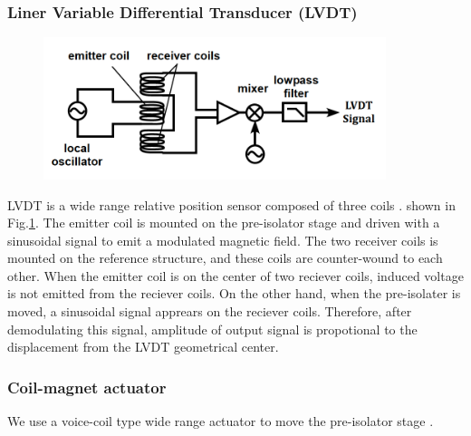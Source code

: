 \subsubsection{Liner Variable Differential Transducer (LVDT)}
\begin{figure}[h]
  \begin{center}   
    \includegraphics[width=10cm]{./img_chap6/img605.png}
    \caption{\cite{sekiguchi2016astudy}}\label{img:img605}
  \end{center}
\end{figure}
LVDT is a wide range relative position sensor composed of three coils \cite{Tariq2002hh}. shown in Fig.\ref{img:img605}. The emitter coil is mounted on the pre-isolator stage and driven with a sinusoidal signal to emit a modulated magnetic field. The two receiver coils is mounted on the reference structure, and these coils are counter-wound to each other. When the emitter coil is on the center of two reciever coils, induced voltage is not emitted from the reciever coils. On the other hand, when the pre-isolater is moved, a sinusoidal signal apprears on the reciever coils. Therefore, after demodulating this signal, amplitude of output signal is propotional to the displacement from the LVDT geometrical center.

\subsubsection{Coil-magnet actuator}
We use a voice-coil type wide range actuator to move the pre-isolator stage \cite{wang2002constant}.

